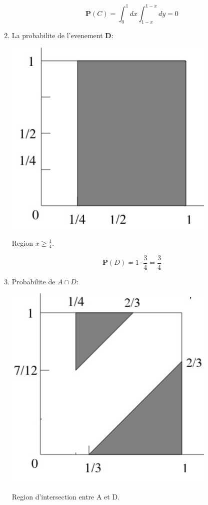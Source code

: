 \documentclass[a4paper]{tufte-handout}
\begin{document}
\begin{enumerate}
\begin{equation*}
\mathbf{P}(C) = \int_0^1dx \int_{1-x}^{1-x}dy = 0
\end{equation*}

\item La probabilite de l'evenement $\mathbf{D}$:\\

\begin{marginfigure}
  \centering
  \includegraphics[width=0.8\textwidth]{figures/exo2_4.png}
  \caption{Region $x \geq \frac{1}{4}$.}
\end{marginfigure}

\begin{equation*}
  \mathbf{P}(D) = 1\cdot \frac{ 3}{4}  = \frac{3}{4}
\end{equation*}

\item Probabilite de $A\cap D$:\\

\begin{marginfigure}
  \centering
  \includegraphics[width=0.8\textwidth]{figures/exo2_5.png}
  \caption{Region d'intersection entre A et D.}
\end{marginfigure}


\end{enumerate}
\end{document}

